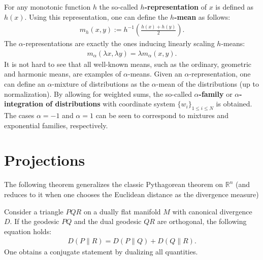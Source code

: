     For any monotonic function $h$ the so-called \textbf{$h$-representation} of $x$ is defined as $h(x)$. Using this representation, one can define the \textbf{$h$-mean} as follows:
    \begin{gather}
        m_h(x,y) := h^{-1}\left(\frac{h(x)+h(y)}{2}\right).
    \end{gather}
    The $\alpha$-representations are exactly the ones inducing linearly scaling $h$-means:
    \begin{gather}
        m_\alpha(\lambda x,\lambda y) = \lambda m_\alpha(x,y).
    \end{gather}
    It is not hard to see that all well-known means, such as the ordinary, geometric and harmonic means, are examples of $\alpha$-means. Given an $\alpha$-representation, one can define an $\alpha$-mixture of distributions as the $\alpha$-mean of the distributions (up to normalization). By allowing for weighted sums, the so-called \textbf{$\alpha$-family} or \textbf{$\alpha$-integration of distributions} with coordinate system $\{w_i\}_{1\leq i\leq N}$ is obtained. The cases $\alpha=-1$ and $\alpha=1$ can be seen to correspond to mixtures and exponential families, respectively.

\section{Projections}

    The following theorem generalizes the classic Pythagorean theorem on $\mathbb{R}^n$ (and reduces to it when one chooses the Euclidean distance as the divergence measure)
    \begin{theorem}[Pythagoras]
        Consider a triangle $PQR$ on a dually flat manifold $M$ with canonical divergence $D$. If the geodesic $PQ$ and the dual geodesic $QR$ are orthogonal, the following equation holds:
        \begin{gather}
            D(P\|R) = D(P\|Q) + D(Q\|R).
        \end{gather}
        One obtains a conjugate statement by dualizing all quantities.
    \end{theorem}

